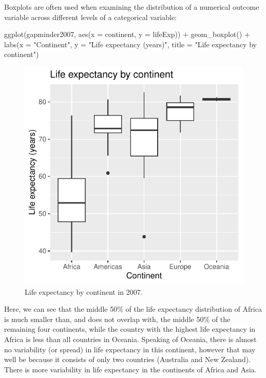 \documentclass[
  letterpaper,
  DIV=11,
  numbers=noendperiod]{scrartcl}
\newenvironment{Shaded}{\begin{snugshade}}{\end{snugshade}}
\newcommand{\AttributeTok}[1]{\textcolor[rgb]{0.40,0.45,0.13}{#1}}
\newcommand{\FunctionTok}[1]{\textcolor[rgb]{0.28,0.35,0.67}{#1}}
\newcommand{\NormalTok}[1]{\textcolor[rgb]{0.00,0.23,0.31}{#1}}
\newcommand{\SpecialCharTok}[1]{\textcolor[rgb]{0.37,0.37,0.37}{#1}}
\newcommand{\StringTok}[1]{\textcolor[rgb]{0.13,0.47,0.30}{#1}}
\begin{document}
Boxplots are often used when examining the distribution of a numerical
outcome variable across different levels of a categorical variable:

\begin{Shaded}
\begin{Highlighting}[]
\FunctionTok{ggplot}\NormalTok{(gapminder2007, }\FunctionTok{aes}\NormalTok{(}\AttributeTok{x =}\NormalTok{ continent, }\AttributeTok{y =}\NormalTok{ lifeExp)) }\SpecialCharTok{+}
  \FunctionTok{geom\_boxplot}\NormalTok{() }\SpecialCharTok{+}
  \FunctionTok{labs}\NormalTok{(}\AttributeTok{x =} \StringTok{"Continent"}\NormalTok{, }\AttributeTok{y =} \StringTok{"Life expectancy (years)"}\NormalTok{, }
       \AttributeTok{title =} \StringTok{"Life expectancy by continent"}\NormalTok{)}
\end{Highlighting}
\end{Shaded}

\begin{figure}[H]

{\centering \includegraphics{index_files/figure-pdf/unnamed-chunk-13-1.pdf}

}

\caption{Life expectancy by continent in 2007.}

\end{figure}%

Here, we can see that the middle 50\% of the life expectancy
distribution of Africa is much smaller than, and does not overlap with,
the middle 50\% of the remaining four continents, while the country with
the highest life expectancy in Africa is less than all countries in
Oceania. Speaking of Oceania, there is almost no variability (or spread)
in life expectancy in this continent, however that may well be because
it consists of only two countries (Australia and New Zealand). There is
more variability in life expectancy in the continents of Africa and
Asia.
\end{document}
